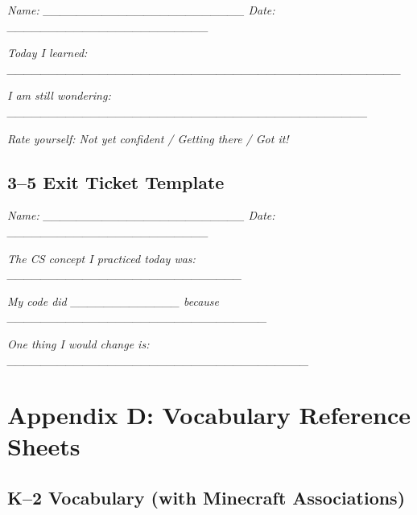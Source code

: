\documentclass[11pt,letterpaper]{article}
\begin{document}
\textit{Name: \_\_\_\_\_\_\_\_\_\_\_\_\_\_\_\_\_\_\_\_\_\_\_\_     Date: \_\_\_\_\_\_\_\_\_\_\_\_\_\_\_\_\_\_\_\_\_\_\_\_}

\textit{Today I learned: \_\_\_\_\_\_\_\_\_\_\_\_\_\_\_\_\_\_\_\_\_\_\_\_\_\_\_\_\_\_\_\_\_\_\_\_\_\_\_\_\_\_\_\_\_\_\_}

\textit{I am still wondering: \_\_\_\_\_\_\_\_\_\_\_\_\_\_\_\_\_\_\_\_\_\_\_\_\_\_\_\_\_\_\_\_\_\_\_\_\_\_\_\_\_\_\_}

\textit{Rate yourself:   Not yet confident  /  Getting there  /  Got it!}

\subsection{3--5 Exit Ticket Template}
\label{sub:35ExitTicketTemplate}

\textit{Name: \_\_\_\_\_\_\_\_\_\_\_\_\_\_\_\_\_\_\_\_\_\_\_\_     Date: \_\_\_\_\_\_\_\_\_\_\_\_\_\_\_\_\_\_\_\_\_\_\_\_}

\textit{The CS concept I practiced today was: \_\_\_\_\_\_\_\_\_\_\_\_\_\_\_\_\_\_\_\_\_\_\_\_\_\_\_\_}

\textit{My code did \_\_\_\_\_\_\_\_\_\_\_\_\_ because \_\_\_\_\_\_\_\_\_\_\_\_\_\_\_\_\_\_\_\_\_\_\_\_\_\_\_\_\_\_\_}

\textit{One thing I would change is: \_\_\_\_\_\_\_\_\_\_\_\_\_\_\_\_\_\_\_\_\_\_\_\_\_\_\_\_\_\_\_\_\_\_\_\_}

\newpage
\section{Appendix D: Vocabulary Reference Sheets}
\label{sec:AppendixDVocabularyReferenceSheets}

\subsection{K--2 Vocabulary (with Minecraft Associations)}
\label{sub:K2VocabularywithMinecraftAssociations}
\end{document}
